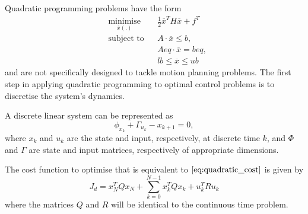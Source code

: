 \par Quadratic programming problems \cite{frank1956algorithm} have the form
\begin{equation}
    \label{eq:gen_quad_prog}
    \begin{aligned}
    & \underset{\overline{x}(.)}{\text{minimise}} && \frac{1}{2} \overline{x}^T H \overline{x} + f^T  \\
    & \text{subject to} && A \cdot \overline{x} \leq b, \\
    & && Aeq \cdot \overline{x} = beq, \\
    & && lb \leq \overline{x} \leq ub
    \end{aligned}
\end{equation} 
and are not specifically designed to tackle motion planning problems. The first step in applying quadratic programming to optimal control problems is to discretise the system's dynamics. 
\par A discrete linear system can be represented as
\begin{equation}
    \label{eq:discrete_state_space} 
    \phi_{x_k} + \Gamma_{u_k} - x_{k+1} = 0,
\end{equation}
where $x_k$ and $u_k$ are the state and input, respectively, at discrete time $k$, and $\Phi$ and $\Gamma$ are state and input matrices, respectively of appropriate dimensions.
\par The cost function to optimise that is equivalent to $\ref{eq:quadratic_cost}$ is given by
\begin{equation}
    J_d = x_N^T Q x_N + \sum_{k=0}^{N-1} x_k^T Q x_k + u_k^T R u_k
    \label{eq:discrete_quad_cost}
\end{equation}
where the matrices $Q$ and $R$ will be identical to the continuous time problem.


